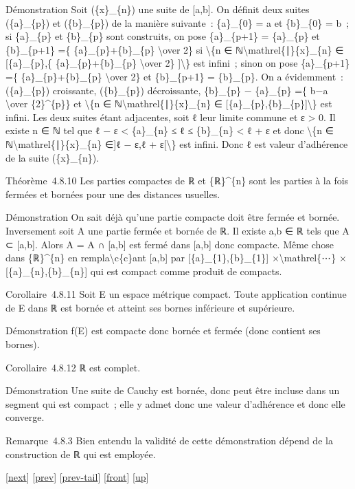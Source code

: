 \documentclass[]{article}
\begin{document}
Démonstration Soit (\{x\}\_\{n\}) une suite de {[}a,b{]}. On définit
deux suites (\{a\}\_\{p\}) et (\{b\}\_\{p\}) de la manière suivante~:
\{a\}\_\{0\} = a et \{b\}\_\{0\} = b~; si \{a\}\_\{p\} et \{b\}\_\{p\}
sont construits, on pose \{a\}\_\{p+1\} = \{a\}\_\{p\} et \{b\}\_\{p+1\}
=\{ \{a\}\_\{p\}+\{b\}\_\{p\} \textbackslash{}over 2\} si
\textbackslash{}\{n ∈ ℕ\textbackslash{}mathrel\{∣\}\{x\}\_\{n\} ∈
{[}\{a\}\_\{p\},\{ \{a\}\_\{p\}+\{b\}\_\{p\} \textbackslash{}over 2\}
{]}\textbackslash{}\} est infini~; sinon on pose \{a\}\_\{p+1\} =\{
\{a\}\_\{p\}+\{b\}\_\{p\} \textbackslash{}over 2\} et \{b\}\_\{p+1\} =
\{b\}\_\{p\}. On a évidemment~: (\{a\}\_\{p\}) croissante,
(\{b\}\_\{p\}) décroissante, \{b\}\_\{p\} − \{a\}\_\{p\} =\{ b−a
\textbackslash{}over \{2\}\^{}\{p\}\} et \textbackslash{}\{n ∈
ℕ\textbackslash{}mathrel\{∣\}\{x\}\_\{n\} ∈
{[}\{a\}\_\{p\},\{b\}\_\{p\}{]}\textbackslash{}\} est infini. Les deux
suites étant adjacentes, soit ℓ leur limite commune et ε \textgreater{}
0. Il existe n ∈ ℕ tel que ℓ − ε \textless{} \{a\}\_\{n\} ≤ ℓ ≤
\{b\}\_\{n\} \textless{} ℓ + ε et donc \textbackslash{}\{n ∈
ℕ\textbackslash{}mathrel\{∣\}\{x\}\_\{n\} ∈{]}ℓ − ε,ℓ +
ε{[}\textbackslash{}\} est infini. Donc ℓ est valeur d'adhérence de la
suite (\{x\}\_\{n\}).

Théorème~4.8.10 Les parties compactes de ℝ et \{ℝ\}\^{}\{n\} sont les
parties à la fois fermées et bornées pour une des distances usuelles.

Démonstration On sait déjà qu'une partie compacte doit être fermée et
bornée. Inversement soit A une partie fermée et bornée de ℝ. Il existe
a,b ∈ ℝ tels que A ⊂ {[}a,b{]}. Alors A = A ∩ {[}a,b{]} est fermé dans
{[}a,b{]} donc compacte. Même chose dans \{ℝ\}\^{}\{n\} en
rempla\textbackslash{}c\{c\}ant {[}a,b{]} par
{[}\{a\}\_\{1\},\{b\}\_\{1\}{]} ×\textbackslash{}mathrel\{⋯\} ×
{[}\{a\}\_\{n\},\{b\}\_\{n\}{]} qui est compact comme produit de
compacts.

Corollaire~4.8.11 Soit E un espace métrique compact. Toute application
continue de E dans ℝ est bornée et atteint ses bornes inférieure et
supérieure.

Démonstration f(E) est compacte donc bornée et fermée (donc contient ses
bornes).

Corollaire~4.8.12 ℝ est complet.

Démonstration Une suite de Cauchy est bornée, donc peut être incluse
dans un segment qui est compact~; elle y admet donc une valeur
d'adhérence et donc elle converge.

Remarque~4.8.3 Bien entendu la validité de cette démonstration dépend de
la construction de ℝ qui est employée.

{[}\href{coursse26.html}{next}{]} {[}\href{coursse24.html}{prev}{]}
{[}\href{coursse24.html\#tailcoursse24.html}{prev-tail}{]}
{[}\href{coursse25.html}{front}{]}
{[}\href{coursch5.html\#coursse25.html}{up}{]}
\end{document}
